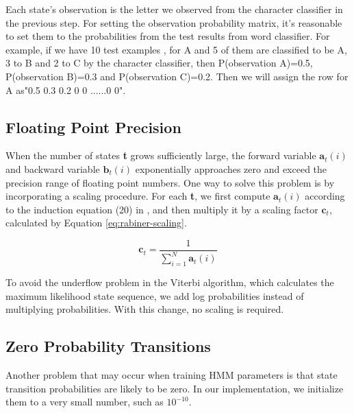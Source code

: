 \begin{enumerate}
Each state's observation is the letter we observed from the character classifier in the previous step. For setting the observation probability matrix, it's reasonable to set them to the probabilities from the test results from word classifier. For example, if we have 10 test examples , for A and 5 of them are classified to be A, 3 to B and 2 to C by the character classifier, then P(observation A)=0.5, P(observation B)=0.3 and P(observation C)=0.2. Then we will assign the row for A as"0.5 0.3 0.2 0 0 ......0 0".

\end{enumerate}

\subsection{Floating Point Precision}

When the number of states \textbf{t} grows sufficiently large, the forward variable $\textbf{a}_t(i)$ and backward variable  $\textbf{b}_t(i)$  exponentially approaches zero and exceed the precision range of floating point numbers. 
One way to solve this problem is by incorporating a scaling procedure.
For each \textbf{t}, we first compute $\textbf{a}_t(i)$ according to the induction equation (20) in  \cite{Rabiner1989}, and then multiply it by a scaling factor  $\textbf{c}_t$, calculated by Equation \ref{eq:rabiner-scaling}.

\begin{equation}\label{eq:rabiner-scaling}
\textbf{c}_t = \frac{1}{ \displaystyle\sum_{i=1}^N \textbf{a}_t(i)}
\end{equation}

To avoid the underflow problem in the Viterbi algorithm, which calculates the maximum likelihood state sequence, we add log probabilities instead of multiplying probabilities.
With this change, no scaling is required.

\subsection{Zero Probability Transitions}
Another problem that may occur when training HMM parameters is that state transition probabilities are likely to be zero.
In our implementation, we initialize them to a very small number, such as \textbf{ $10^{-10}$}.



